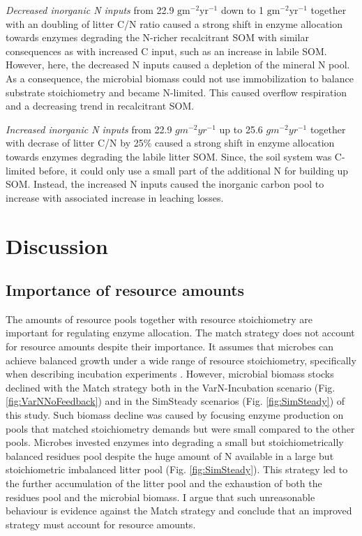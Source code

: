 \textit{Decreased inorganic N inputs} from 22.9
${\textrm{gm}^{-2}\textrm{yr}^{-1}}$ down to 1
${\textrm{gm}^{-2}\textrm{yr}^{-1}}$ together with an doubling of litter C/N
ratio caused a strong shift in enzyme allocation towards enzymes degrading the
N-richer recalcitrant SOM with similar consequences as with increased C input,
such as an increase in labile SOM. However, here, the decreased N inputs caused
a depletion of the mineral N pool.
As a consequence, the microbial biomass could not use immobilization to
balance substrate stoichiometry and became N-limited.
This caused overflow respiration and a decreasing trend in recalcitrant SOM.

\textit{Increased inorganic N inputs} from 22.9 $gm^{-2}yr^{-1}$ up to 25.6
$gm^{-2}yr^{-1}$ together with decrase of litter C/N by 25\% caused a strong
shift in enzyme allocation towards enzymes degrading the labile litter SOM.
Since, the soil system was C-limited before, it could only use a small part of
the additional N for building up SOM.
Instead, the increased N inputs caused the inorganic carbon pool to increase
with associated increase in leaching losses.

\section{Discussion}
\subsection{Importance of resource amounts}
The amounts of resource pools together with resource stoichiometry are
important for regulating enzyme allocation. The match strategy does not account
for resource amounts despite their importance. It assumes that microbes can
achieve balanced growth under a wide range of resource stoichiometry,
specifically when describing incubation experiments \citep{Moorhead12,
Ballantyne14}. However, microbial biomass stocks declined with the Match
strategy both in the VarN-Incubation scenario (Fig. \ref{fig:VarNNoFeedback})
and in the SimSteady scenarios (Fig. \ref{fig:SimSteady}) of this study. Such
biomass decline was caused by focusing enzyme production on pools that matched
stoichiometry demands but were small compared to the other pools. Microbes
invested enzymes into degrading a small but stoichiometrically
balanced residues pool despite the huge amount of N available in a large but
stoichiometric imbalanced litter pool (Fig.
\ref{fig:SimSteady}). This strategy led to the further accumulation of the
litter pool and the exhaustion of both the residues pool and the microbial
biomass. I argue that such unreasonable behaviour is evidence against the Match
strategy and conclude that an improved strategy must account for resource
amounts.


